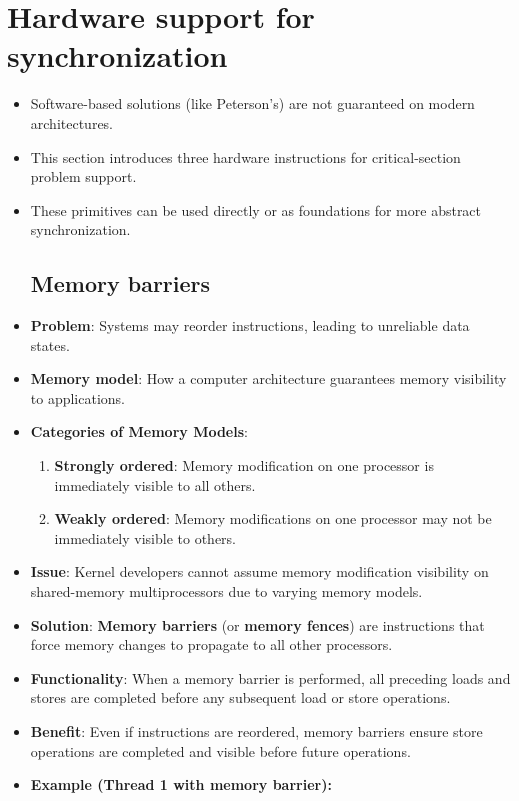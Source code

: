 \section{Hardware support for synchronization}
\begin{itemize}
  \item Software-based solutions (like Peterson's) are not guaranteed on modern
        architectures.
  \item This section introduces three hardware instructions for critical-section
        problem support.
  \item These primitives can be used directly or as foundations for more abstract
        synchronization.

        \subsection{Memory barriers}
  \item \textbf{Problem}: Systems may reorder instructions, leading to unreliable data states.
  \item \textbf{Memory model}: How a computer architecture guarantees memory visibility to applications.
  \item \textbf{Categories of Memory Models}:
        \begin{enumerate}
          \item \textbf{Strongly ordered}: Memory modification on one processor is immediately visible to all others.
          \item \textbf{Weakly ordered}: Memory modifications on one processor may not be immediately visible to others.
        \end{enumerate}
  \item \textbf{Issue}: Kernel developers cannot assume memory modification visibility on shared-memory multiprocessors due to varying memory models.
  \item \textbf{Solution}: \textbf{Memory barriers} (or \textbf{memory fences}) are instructions that force memory changes to propagate to all other processors.
  \item \textbf{Functionality}: When a memory barrier is performed, all preceding loads and stores are completed before any subsequent load or store operations.
  \item \textbf{Benefit}: Even if instructions are reordered, memory barriers ensure store operations are completed and visible before future operations.
  \item \textbf{Example (Thread 1 with memory barrier):}

\end{itemize}
